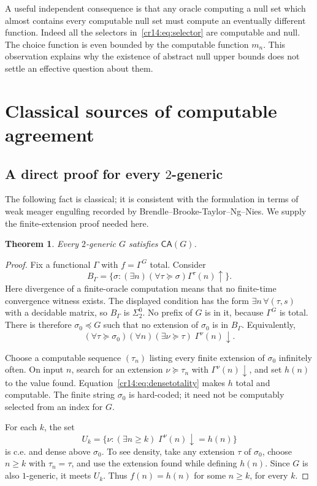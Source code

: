 \documentclass[11pt,a4paper]{article}
\newcommand{\extends}{\succeq}
\newcommand{\prefix}{\preccurlyeq}
\newcommand{\CA}{\mathsf{CA}}
\newtheorem{theorem}{Theorem}[section]
\theoremstyle{definition}
\theoremstyle{remark}
\begin{document}
A useful independent consequence is that any oracle computing a null set
which almost contains every computable null set must compute an eventually
different function. Indeed all the selectors in~\eqref{cr14:eq:selector} are
computable and null. The choice function is even bounded by the computable
function $m_n$. This observation explains why the existence of abstract
null upper bounds does not settle an effective question about them.

\section{Classical sources of computable agreement}
\label{cr14:sec:agreement}
\subsection{A direct proof for every \texorpdfstring{$2$}{2}-generic}
The following fact is classical; it is consistent with the formulation in
terms of weak meager engulfing recorded by Brendle--Brooke-Taylor--Ng--Nies.
We supply the finite-extension proof needed here.\cite[Theorem~4.2 and
Section~4, item~(5)]{BBNN}

\begin{theorem}\label{cr14:thm:twoGenericCA}
Every $2$-generic $G$ satisfies $\CA(G)$.
\end{theorem}
\begin{proof}
Fix a functional $\Gamma$ with $f=\Gamma^G$ total. Consider
\[
 B_\Gamma=\{\sigma:(\exists n)(\forall\tau\extends\sigma)
                         \Gamma^\tau(n)\uparrow\}.
\]
Here divergence of a finite-oracle computation means that no finite-time
convergence witness exists. The displayed condition has the form
$\exists n\,\forall(\tau,s)$ with a decidable matrix, so $B_\Gamma$ is
$\Sigma^0_2$. No prefix of $G$ is in it, because $\Gamma^G$ is total.
There is therefore $\sigma_0\prefix G$ such that no extension of
$\sigma_0$ is in $B_\Gamma$. Equivalently,
\begin{equation}\label{cr14:eq:densetotality}
 (\forall\tau\extends\sigma_0)(\forall n)
       (\exists\nu\extends\tau)\;\Gamma^\nu(n)\downarrow.
\end{equation}

Choose a computable sequence $(\tau_n)$ listing every finite extension of
$\sigma_0$ infinitely often. On input $n$, search for an extension
$\nu\extends\tau_n$ with $\Gamma^\nu(n)\downarrow$, and set $h(n)$ to
the value found. Equation~\eqref{cr14:eq:densetotality} makes $h$ total and
computable. The finite string $\sigma_0$ is hard-coded; it need not be
computably selected from an index for $G$.

For each $k$, the set
\[
 U_k=\{\nu:(\exists n\geq k)\;\Gamma^\nu(n)\downarrow=h(n)\}
\]
is c.e. and dense above $\sigma_0$. To see density, take any extension
$\tau$ of $\sigma_0$, choose $n\geq k$ with $\tau_n=\tau$, and use the
extension found while defining $h(n)$. Since $G$ is also $1$-generic, it
meets $U_k$. Thus $f(n)=h(n)$ for some $n\geq k$, for every $k$.
\end{proof}
\end{document}
